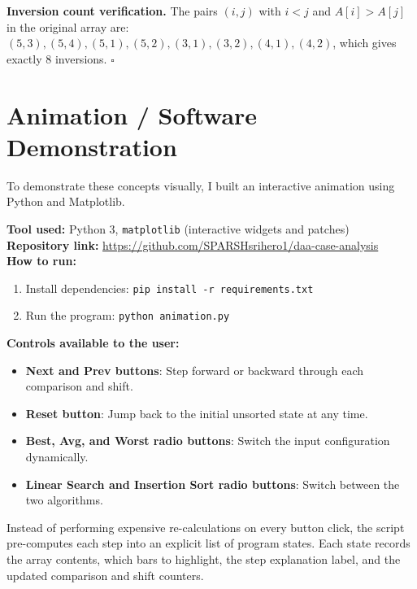 \documentclass[11pt,a4paper]{article}
\newcommand{\animationlink}{https://github.com/SPARSHsrihero1/daa-case-analysis}
\begin{document}
\textbf{Inversion count verification.} The pairs $(i,j)$ with $i<j$ and
$A[i]>A[j]$ in the original array are:
$(5,3),(5,4),(5,1),(5,2),(3,1),(3,2),(4,1),(4,2)$, which gives exactly 8 inversions. \hfill$\square$

\section{Animation / Software Demonstration}

To demonstrate these concepts visually, I built an interactive animation using Python and Matplotlib.

\textbf{Tool used:} Python 3, \texttt{matplotlib} (interactive widgets and patches)\\
\textbf{Repository link:} \url{\animationlink}\\
\textbf{How to run:}
\begin{enumerate}
  \item Install dependencies: \texttt{pip install -r requirements.txt}
  \item Run the program: \texttt{python animation.py}
\end{enumerate}
\textbf{Controls available to the user:}
\begin{itemize}
  \item \textbf{Next and Prev buttons}: Step forward or backward through each comparison and shift.
  \item \textbf{Reset button}: Jump back to the initial unsorted state at any time.
  \item \textbf{Best, Avg, and Worst radio buttons}: Switch the input configuration dynamically.
  \item \textbf{Linear Search and Insertion Sort radio buttons}: Switch between the two algorithms.
\end{itemize}

Instead of performing expensive re-calculations on every button click, the script pre-computes each step into an explicit list of program states. Each state records the array contents, which bars to highlight, the step explanation label, and the updated comparison and shift counters.
\end{document}
